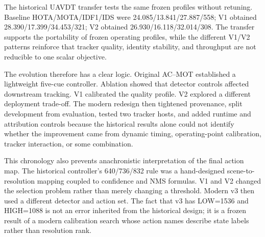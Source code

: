The historical UAVDT transfer tests the same frozen profiles without retuning. Baseline HOTA/MOTA/IDF1/IDS were 24.085/13.841/27.887/558; V1 obtained 28.390/17.399/34.453/321; V2 obtained 26.930/16.118/32.014/308. The transfer supports the portability of frozen operating profiles, while the different V1/V2 patterns reinforce that tracker quality, identity stability, and throughput are not reducible to one scalar objective.

The evolution therefore has a clear logic. Original AC--MOT established a lightweight five-cue controller. Ablation showed that detector controls affected downstream tracking. V1 calibrated the quality profile. V2 explored a different deployment trade-off. The modern redesign then tightened provenance, split development from evaluation, tested two tracker hosts, and added runtime and attribution controls because the historical results alone could not identify whether the improvement came from dynamic timing, operating-point calibration, tracker interaction, or some combination.

This chronology also prevents anachronistic interpretation of the final action map. The historical controller's 640/736/832 rule was a hand-designed scene-to-resolution mapping coupled to confidence and NMS formulas. V1 and V2 changed the selection problem rather than merely changing a threshold. Modern v3 then used a different detector and action set. The fact that v3 has LOW=1536 and HIGH=1088 is not an error inherited from the historical design; it is a frozen result of a modern calibration search whose action names describe state labels rather than resolution rank.
